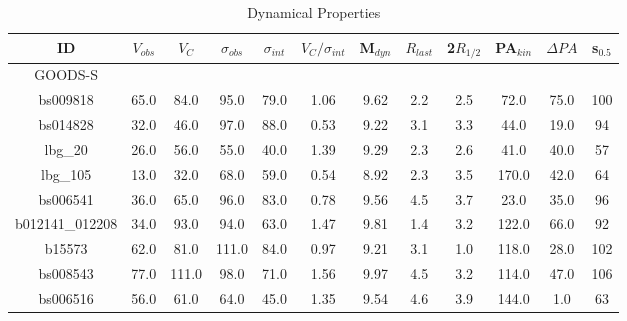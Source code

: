 \documentclass[fleqn,usenatbib]{mn2e}
\begin{document}
\begin{table*}
\centering
\caption{Dynamical Properties}
\label{tab:kin_props}
\begin{tabular}{cccccccccccc}

 \hline
ID & $V_{obs}$ & $V_{C}$ & $\sigma_{obs}$ & $\sigma_{int}$ & $V_{C}/\sigma_{int}$ & M$_{dyn}$  & $R_{last}$ & 2$R_{1/2}$ & PA$_{kin}$ & $\Delta PA$ & s$_{0.5}$\\
 \hline
 GOODS-S & & & & & & & & & & & \\
 \hline
bs009818        & 65.0                    & 84.0                     & 95.0                  & 79.0                   & 1.06           & 9.62      & 2.2        & 2.5        & 72.0    & 75.0      & 100 \\
bs014828        & 32.0                    & 46.0                     & 97.0                  & 88.0                   & 0.53           & 9.22      & 3.1      & 3.3      & 44.0    & 19.0      & 94 \\
lbg\_20         & 26.0                    & 56.0                     & 55.0                  & 40.0                   & 1.39           & 9.29      & 2.3      & 2.6        & 41.0    & 40.0      & 57 \\
lbg\_105        & 13.0                    & 32.0                     & 68.0                  & 59.0                   & 0.54           & 8.92      & 2.3      & 3.5       & 170.0   & 42.0      & 64 \\
bs006541        & 36.0                    & 65.0                     & 96.0                  & 83.0                   & 0.78           & 9.56      & 4.5      & 3.7       & 23.0    & 35.0      & 96 \\
b012141\_012208 & 34.0                    & 93.0                     & 94.0                  & 63.0                   & 1.47           & 9.81      & 1.4      & 3.2       & 122.0   & 66.0      & 92 \\
b15573          & 62.0                    & 81.0                     & 111.0                 & 84.0                   & 0.97           & 9.21      & 3.1      & 1.0       & 118.0   & 28.0      & 102 \\
bs008543        & 77.0                    & 111.0                    & 98.0                  & 71.0                   & 1.56           & 9.97      & 4.5      & 3.2       & 114.0   & 47.0      & 106 \\
bs006516        & 56.0                    & 61.0                     & 64.0                  & 45.0                   & 1.35           & 9.54      & 4.6      & 3.9       & 144.0   & 1.0       & 63 \\

\end{tabular}
\end{table*}
\end{document}
